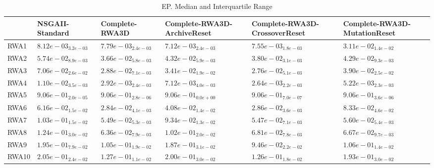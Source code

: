 \documentclass{article}
\begin{document}
\begin{table}
\caption{EP. Median and Interquartile Range}
\label{table: EP}
\centering
\begin{scriptsize}
\begin{tabular}{llllll}
\hline & NSGAII-Standard & Complete-RWA3D & Complete-RWA3D-ArchiveReset & Complete-RWA3D-CrossoverReset &  Complete-RWA3D-MutationReset\\
\hline 
RWA1 & $  8.12e-03_{ 3.2e-03}$ & $  7.79e-03_{ 2.4e-03}$ & \cellcolor{gray95}$  7.12e-03_{ 2.4e-03}$ & \cellcolor{gray25}$  7.55e-03_{ 1.8e-03}$ & $  3.11e-02_{ 1.4e-02}$ \\
RWA2 & $  5.74e-02_{ 8.9e-03}$ & \cellcolor{gray95}$  3.66e-02_{ 5.8e-03}$ & $  4.32e-02_{ 5.9e-03}$ & \cellcolor{gray25}$  3.80e-02_{ 3.1e-03}$ & $  4.29e-02_{ 9.3e-03}$ \\
RWA3 & $  7.06e-02_{ 2.6e-02}$ & \cellcolor{gray25}$  2.88e-02_{ 7.1e-03}$ & $  3.41e-02_{ 1.9e-02}$ & \cellcolor{gray95}$  2.76e-02_{ 5.1e-03}$ & $  3.90e-02_{ 2.5e-02}$ \\
RWA4 & $  1.10e-02_{ 3.5e-03}$ & \cellcolor{gray25}$  2.92e-03_{ 2.4e-03}$ & $  7.12e-03_{ 4.0e-03}$ & \cellcolor{gray95}$  2.64e-03_{ 2.2e-03}$ & $  5.22e-03_{ 2.3e-03}$ \\
RWA5 & $  9.06e-01_{ 2.0e-05}$ & $  9.06e-01_{ 2.8e-06}$ & \cellcolor{gray95}$  9.06e-01_{ 0.0e+00}$ & \cellcolor{gray25}$  9.06e-01_{ 7.0e-07}$ & $  9.06e-01_{ 3.6e-06}$ \\
RWA6 & $  6.16e-02_{ 1.5e-02}$ & \cellcolor{gray95}$  2.84e-02_{ 4.1e-03}$ & $  4.08e-02_{ 1.4e-02}$ & \cellcolor{gray25}$  2.86e-02_{ 3.6e-03}$ & $  8.33e-02_{ 4.6e-02}$ \\
RWA7 & $  1.03e-01_{ 1.5e-02}$ & \cellcolor{gray25}$  5.49e-02_{ 5.3e-03}$ & $  9.34e-02_{ 1.3e-02}$ & \cellcolor{gray95}$  5.47e-02_{ 7.1e-03}$ & $  5.60e-02_{ 5.4e-03}$ \\
RWA8 & $  1.24e-01_{ 3.0e-02}$ & \cellcolor{gray95}$  6.36e-02_{ 7.9e-03}$ & $  1.02e-01_{ 2.0e-02}$ & $  6.81e-02_{ 7.8e-03}$ & \cellcolor{gray25}$  6.67e-02_{ 9.7e-03}$ \\
RWA9 & $  1.95e-01_{ 7.9e-02}$ & \cellcolor{gray25}$  1.05e-01_{ 1.9e-02}$ & $  1.87e-01_{ 3.1e-02}$ & \cellcolor{gray95}$  9.46e-02_{ 2.2e-02}$ & $  1.06e-01_{ 1.4e-02}$ \\
RWA10 & $  2.05e-01_{ 2.4e-02}$ & \cellcolor{gray25}$  1.27e-01_{ 1.1e-02}$ & $  2.00e-01_{ 3.0e-02}$ & \cellcolor{gray95}$  1.26e-01_{ 1.8e-02}$ & $  1.93e-01_{ 3.0e-02}$ \\
\hline
\end{tabular}
\end{scriptsize}
\end{table}
\end{document}
